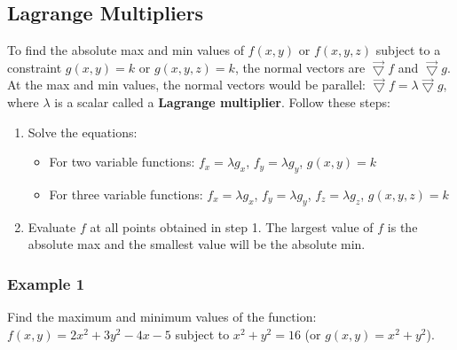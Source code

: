 \documentclass{article}
\newcommand{\tri}{\vec{\bigtriangledown}}
\begin{document}
\subsection{Lagrange Multipliers}
To find the absolute max and min values of $f(x,y)$ or $f(x,y,z)$ subject to a constraint $g(x,y)=k$ or $g(x,y,z)=k$,
the normal vectors are $\tri f$ and $\tri g$.
\\At the max and min values, the normal vectors would be parallel: $\tri f=\lambda\tri g$, where $\lambda$ is a scalar called a \textbf{Lagrange multiplier}.
Follow these steps:\begin{enumerate}
    \itemsep 0em
    \item Solve the equations: \begin{itemize}
        \itemsep 0em
        \item For two variable functions: $f_x=\lambda g_x$, $f_y=\lambda g_y$, $g(x,y)=k$
        \item For three variable functions: $f_x=\lambda g_x$, $f_y=\lambda g_y$, $f_z=\lambda g_z$, $g(x,y,z)=k$
    \end{itemize}
    \item Evaluate $f$ at all points obtained in step 1. The largest value of $f$ is the absolute max and the smallest value will be the absolute min.
\end{enumerate}

\newpage\subsubsection{Example 1}
Find the maximum and minimum values of the function: $f(x,y)=2x^2+3y^2-4x-5$ subject to $x^2+y^2=16$ (or $g(x,y)=x^2+y^2$).
\end{document}
